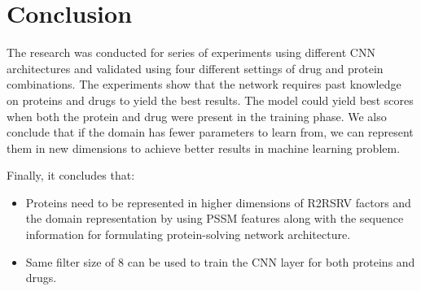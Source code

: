 \chapter{Conclusion}

The research was conducted for series of experiments using different CNN architectures and validated using four different settings of drug and protein combinations. The experiments show that the network requires past knowledge on proteins and drugs to yield the best results. The model could yield best scores when both the protein and drug were present in the training phase. We also conclude that if the domain has fewer parameters to learn from, we can represent them in new dimensions to achieve better results in machine learning problem.

Finally, it concludes that:
\begin{itemize}
    \item Proteins need to be represented in higher dimensions of R2RSRV factors and the domain representation by using PSSM features along with the sequence information for formulating protein-solving network architecture.
    \item Same filter size of 8 can be used to train the CNN layer for both proteins and drugs.
\end{itemize}
